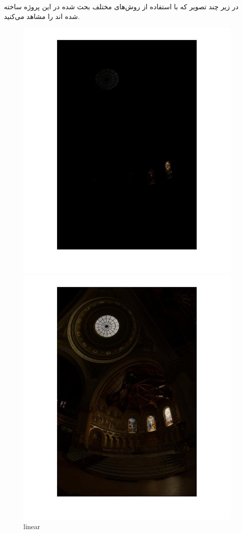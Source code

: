 
در زیر چند تصویر که با استفاده از روش‌های مختلف بحث شده در این پروژه ساخته شده اند را مشاهد می‌کنید.

  
  \begin{figure}[!htb]
  	\includegraphics[width=\linewidth]{images/linearhdr1}
  	\caption{linear}\label{fig:logtonemap}
  	\endminipage\hfill
  	\includegraphics[width=\linewidth]{images/loghdr1}

\end{figure}
